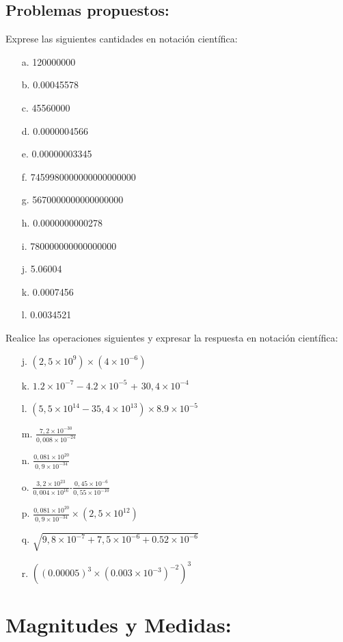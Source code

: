 \documentclass[a5paper,pagesize,10pt,bibtotoc,pointlessnumbers,
normalheadings,DIV=9,fleqn,x11names,table,twoside=false]{scrbook}
\begin{document}
\subsection{Problemas propuestos:}

Exprese las siguientes cantidades en notación científica:

\begin{itemize}
 \item[a.] 120000000
 \item[b.] 0.00045578
 \item[c.] 45560000
 \item[d.] 0.0000004566
 \item[e.] 0.00000003345
 \item[f.] 7459980000000000000000
 \item[g.] 5670000000000000000
 \item[h.] 0.0000000000278
 \item[i.] 780000000000000000
 \item[j.] 5.06004 
 \item[k.] 0.0007456
 \item[l.] 0.0034521
\end{itemize}

Realice las operaciones siguientes y expresar la respuesta en notación científica:

\begin{itemize}
 \item[j.] $(2,5\times10^{9})\times(4\times10^{-6})$
 \item[k.] $1.2\times10^{-7}-4.2\times10^{-5}$ + $30,4\times10^{-4}$
 \item[l.] $(5,5\times10^{14}-35,4\times10^{13})\times 8.9\times10^{-5}$
 \item[m.] $\frac{7,2\times10^{-30}}{0,008\times10^{-24}}$
 \item[n.] $\frac{0,081\times10^{20}}{0,9\times10^{-34}}$
\item[o.]  $\frac{3,2\times10^{23}}{0,004\times10^{16}}$-$\frac{0,45\times10^{-6}}{0,55\times10^{-10}}$
\item[p.] $\frac{0,081\times10^{20}}{0,9\times10^{-34}}\times(2,5\times10^{12})$
\item[q.] $\sqrt{9,8\times10^{-7}+7,5\times10^{-6}+0.52\times 10^{-6}}$
\item[r.] $((0.00005)^3\times (0.003\times 10^{-3})^{-2})^3$
\end{itemize}

\section{Magnitudes y Medidas:}
\end{document}
